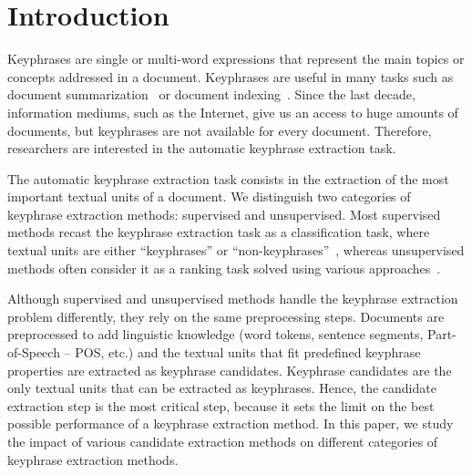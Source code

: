 \section{Introduction}
\label{sec:section}
  Keyphrases are single or multi-word expressions that represent the main topics
  or concepts addressed in a document. Keyphrases are useful in many tasks such
  as document summarization~\cite{avanzo2005keyphrase} or document
  indexing~\cite{medelyan2008smalltrainingset}. Since the last decade,
  information mediums, such as the Internet, give us an access to huge amounts
  of documents, but keyphrases are not available for every document. Therefore,
  researchers are interested in the automatic keyphrase extraction task.

  The automatic keyphrase extraction task consists in the extraction of the
  most important textual units of a document. We distinguish two categories of
  keyphrase extraction methods: supervised and unsupervised. Most supervised
  methods recast the keyphrase extraction task as a classification task, where
  textual units are either ``keyphrases'' or
  ``non-keyphrases''~\cite{witten1999kea}, whereas unsupervised methods often
  consider it as a ranking task solved using various
  approaches~\cite{hassan2010conundrums}.

  Although supervised and unsupervised methods handle the keyphrase extraction
  problem differently, they rely on the same preprocessing steps. Documents are
  preprocessed to add linguistic knowledge (word tokens, sentence segments,
  Part-of-Speech -- POS, etc.) and the textual units that fit predefined
  keyphrase properties are extracted as keyphrase candidates. Keyphrase
  candidates are the only textual units that can be extracted as keyphrases.
  Hence, the candidate extraction step is the most critical step, because it
  sets the limit on the best possible performance of a keyphrase extraction
  method. In this paper, we study the impact of various candidate extraction
  methods on different categories of keyphrase extraction methods.

